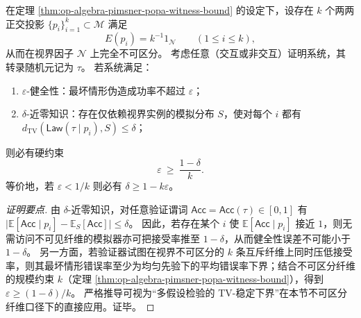 \begin{corollary}\label{cor:op-algebra-nearzk-soundness-fiber-tradeoff}
在定理 \ref{thm:op-algebra-pimsner-popa-witness-bound} 的设定下，设存在 \(k\) 个两两正交投影 \(\{p_i\}_{i=1}^k\subset\mathcal{M}\) 满足
\[
E(p_i)=k^{-1}1_{\mathcal{N}}\qquad(1\le i\le k),
\]
从而在视界因子 \(\mathcal{N}\) 上完全不可区分。
考虑任意（交互或非交互）证明系统，其转录随机元记为 \(\tau\)。
若系统满足：
\begin{enumerate}
  \item \(\varepsilon\)-健全性：最坏情形伪造成功率不超过 \(\varepsilon\)；
  \item \(\delta\)-近零知识：存在仅依赖视界实例的模拟分布 \(S\)，使对每个 \(i\) 都有
  \(d_{\mathrm{TV}}(\mathsf{Law}(\tau\mid p_i),S)\le \delta\)；
\end{enumerate}
则必有硬约束
\[
\boxed{\;\varepsilon\ \ge\ \frac{1-\delta}{k}.\;}
\]
等价地，若 \(\varepsilon<1/k\) 则必有 \(\delta\ge 1-k\varepsilon\)。
\end{corollary}
\begin{proof}[证明要点]
由 \(\delta\)-近零知识，对任意验证谓词 \(\mathsf{Acc}=\mathsf{Acc}(\tau)\in[0,1]\) 有
\(
\bigl|\mathbb{E}[\mathsf{Acc}\mid p_i]-\mathbb{E}_S[\mathsf{Acc}]\bigr|\le \delta
\)。
因此，若存在某个 \(i\) 使 \(\mathbb{E}[\mathsf{Acc}\mid p_i]\) 接近 \(1\)，则无需访问不可见纤维的模拟器亦可把接受率推至 \(1-\delta\)，从而健全性误差不可能小于 \(1-\delta\)。
另一方面，若验证器试图在视界不可区分的 \(k\) 条互斥纤维上同时压低接受率，则其最坏情形错误率至少为均匀先验下的平均错误率下界；结合不可区分纤维的规模约束 \(k\)（定理 \ref{thm:op-algebra-pimsner-popa-witness-bound}），得到 \(\varepsilon\ge(1-\delta)/k\)。
严格推导可视为“多假设检验的 TV-稳定下界”在本节不可区分纤维口径下的直接应用。证毕。
\end{proof}

